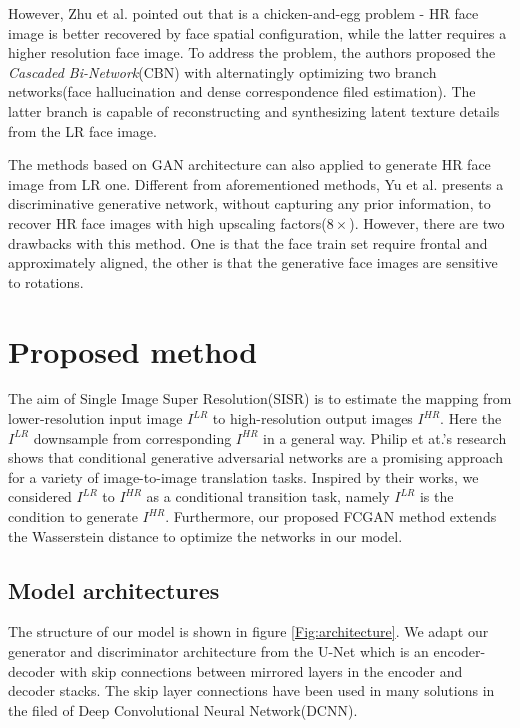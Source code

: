 \documentclass[conference,compsoc]{IEEEtran}
\begin{document}
However, Zhu et al.\cite{zhu2016deep} pointed out that is a chicken-and-egg problem - HR face image is better recovered by face spatial configuration, while the latter requires a higher resolution face image.  To address the problem, the authors proposed the \textit{Cascaded Bi-Network}(CBN) with alternatingly optimizing two branch networks(face hallucination and dense correspondence filed estimation). The latter branch is capable of reconstructing and synthesizing latent texture details from the LR face image.

The methods based on GAN architecture can also applied to generate HR face image from LR one. Different from aforementioned methods\cite{zhu2016deep, Jiang2016Noise-TCYB, Jiang2016SRLSP}, Yu et al. \cite{Yu-URGAN-ECCV2016} presents a discriminative generative network, without capturing any prior information, to recover HR face images with high upscaling factors($8\times$). However, there are two drawbacks with this method. One is that the face train set require frontal and approximately aligned, the other is that the generative face images are sensitive to rotations.


\section{Proposed method}
\label{gen_inst}

The aim of Single Image Super Resolution(SISR) is to estimate the mapping from lower-resolution input image $I^{LR}$ to high-resolution output images $I^{HR}$. Here the $I^{LR}$ downsample from corresponding $I^{HR}$ in a general way. Philip et at.'s\cite{pix2pix} research shows that conditional generative adversarial networks\cite{mirza2014conditionalGAN} are a promising approach for a variety of image-to-image translation tasks. Inspired by their works\cite{mirza2014conditionalGAN, pix2pix}, we considered $I^{LR}$ to $I^{HR}$ as a conditional transition task, namely $I^{LR}$ is the condition to generate $I^{HR}$. Furthermore, our proposed FCGAN method extends the Wasserstein distance\cite{Arjovsky2017TowardsWGAN, Arjovsky2017WGAN, David-BEGAN2017} to optimize the networks in our model.

\subsection{Model architectures}
The structure of our model is shown in figure \ref{Fig:architecture}. We adapt our generator and discriminator architecture from the U-Net\cite{ronneberger2015U-net} which is an encoder-decoder with skip connections between mirrored layers in the encoder and decoder stacks. The skip layer connections have been used in many solutions\cite{ronneberger2015U-net, huang2016Densenet, orhan2017skip, Densenetsemantic} in the filed of Deep Convolutional Neural Network(DCNN).
\end{document}
